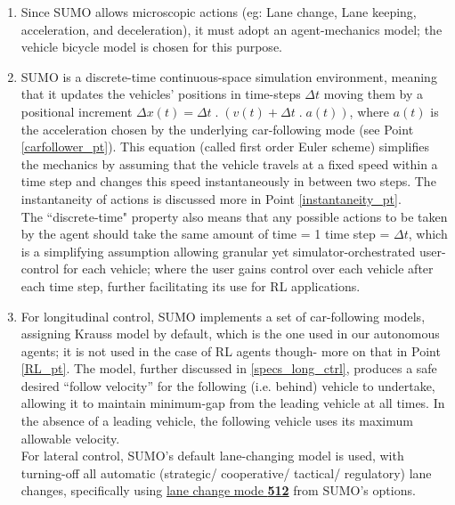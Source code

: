 \begin{itemize}
\begin{enumerate}
    \item Since SUMO allows microscopic actions (eg: Lane change, Lane keeping, acceleration, and deceleration), it must adopt an agent-mechanics model; the vehicle bicycle model is chosen for this purpose.
    
    \item SUMO is a discrete-time continuous-space simulation environment, meaning that it updates the vehicles’ positions in time-steps $\Delta t$ moving them by a positional increment $\Delta x(t) =  \Delta t \; . \; (v(t) + \Delta t \; . \; a(t))$, where $a(t)$ is the acceleration chosen by the underlying car-following mode (see Point \ref{carfollower_pt}). This equation (called first order Euler scheme) simplifies the mechanics by assuming that the vehicle travels at a fixed speed within a time step and changes this speed instantaneously in between two steps. The instantaneity of actions is discussed more in Point \ref{instantaneity_pt}.\\ 
    The ``discrete-time" property also means that any possible actions to be taken by the agent should take the same amount of time = 1 time step = $\Delta t$, which is a simplifying assumption allowing granular yet simulator-orchestrated user-control for each vehicle; where the user gains control over each vehicle after each time step, further facilitating its use for RL applications.

    
    \item For longitudinal control, SUMO implements a set of car-following models\cite{sumomain}, assigning Krauss model\cite{kraussnewmod} by default, which is the one used in our autonomous agents; it is not used in the case of RL agents though- more on that in Point \ref{RL_pt}. The model, further discussed in \ref{specs_long_ctrl}, produces a safe desired “follow velocity” for the following (i.e. behind) vehicle to undertake, allowing it to maintain minimum-gap from the leading vehicle at all times. In the absence of a leading vehicle, the following vehicle uses its maximum allowable velocity.\\
    For lateral control, SUMO's default lane-changing model\cite{sumo_krauss} is used, with turning-off all automatic (strategic/ cooperative/ tactical/ regulatory) lane changes, specifically using \href{https://sumo.dlr.de/docs/TraCI/Change_Vehicle_State.html#lane_change_mode_0xb6}{lane change mode \textbf{512}} from SUMO's options. 
    \label{carfollower_pt}
    

\end{enumerate}
\end{itemize}
